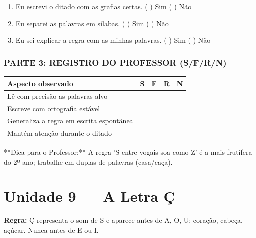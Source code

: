 \begin{exercicio}
\begin{enumerate}[label=\alph*)]
  \item Eu escrevi o ditado com as grafias certas.  \quad ( ) Sim   ( ) Não

  \item Eu separei as palavras em sílabas.  \quad ( ) Sim   ( ) Não

  \item Eu sei explicar a regra com as minhas palavras.  \quad ( ) Sim   ( ) Não

\end{enumerate}

\subsection*{PARTE 3: REGISTRO DO PROFESSOR (S/F/R/N)}

\begin{center}
\renewcommand{\arraystretch}{1.4}
\begin{tabular}{@{}p{9cm}cccc@{}}
\toprule
Aspecto observado & S & F & R & N \\
\midrule
Lê com precisão as palavras-alvo & & & & \\
Escreve com ortografia estável & & & & \\
Generaliza a regra em escrita espontânea & & & & \\
Mantém atenção durante o ditado & & & & \\
\bottomrule\end{tabular}\end{center}

\end{exercicio}

\begin{dica}
**Dica para o Professor:** A regra 'S entre vogais soa como Z' é a mais frutífera do 2º ano; trabalhe em duplas de palavras (casa/caça).
\end{dica}


\chapter{Unidade 9 --- A Letra Ç}


\textbf{Regra:} Ç representa o som de S e aparece antes de A, O, U: coração, cabeça, açúcar. Nunca antes de E ou I.

